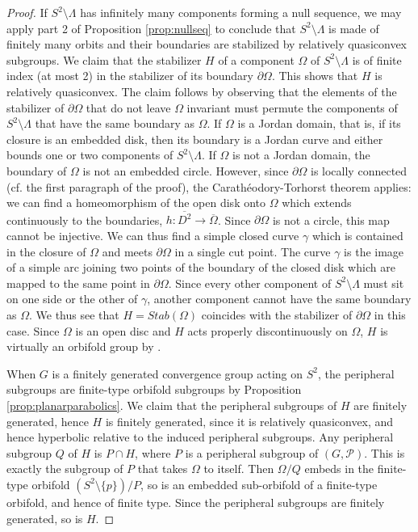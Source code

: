 \documentclass[11pt]{article}
\theoremstyle{definition}
\begin{document}
\begin{proof}
If $ S^2 \setminus\Lambda$ has infinitely many components forming a null sequence, we may apply part 2 of Proposition \ref{prop:nullseq} to conclude that $S^2\setminus\Lambda$ is made of finitely many orbits and their boundaries are stabilized by relatively quasiconvex subgroups. We claim that the stabilizer $H$ of a component $\Omega$ of $S^2\setminus\Lambda$ is of finite index (at most 2) in the stabilizer of its boundary $\partial\Omega$. This shows that $H$ is relatively quasiconvex. The claim follows by observing that the elements of the stabilizer of $\partial\Omega$ that do not leave $\Omega$ invariant must permute the components of $S^2\setminus\Lambda$ that have the same boundary as $\Omega$. If $\Omega$ is a Jordan domain, that is, if its closure is an embedded disk, then its boundary is a Jordan curve and either bounds one or two 
components of $S^2\setminus\Lambda$.  If $\Omega$ is not a Jordan domain, the boundary of $\Omega$ is not an embedded circle. However, since $\partial\Omega$ is locally connected  (cf. the first paragraph of the proof), the Carath\'eodory-Torhorst theorem applies: we can find a homeomorphism of the open disk onto $\Omega$ which extends continuously to the boundaries, {$h: \overline{D^2} \rightarrow \overline{\Omega}$}. Since $\partial\Omega$ is not a circle, this map cannot be injective. We can thus find a simple closed curve $\gamma$ which is contained in the closure of $\Omega$ and meets $\partial\Omega$ in a single cut point. The curve $\gamma$ is the image of a simple arc joining two points of the boundary of the closed disk which are mapped to the same point in $\partial\Omega$. Since every other component of $S^2\setminus\Lambda$ must sit on one side or the other of $\gamma$, another component cannot have the same boundary as $\Omega$. We thus see that $H = Stab(\Omega)$ coincides with the stabilizer of $\partial\Omega$ in this case.  Since $\Omega$ is an open disc and $H$ acts properly discontinuously on $\Omega$, $H$ is  virtually an orbifold group by \cite[Cor. 3.2]{hruska:walsh}.

When $G$ is a finitely generated convergence group acting on $S^2$, the peripheral subgroups are finite-type orbifold subgroups by Proposition \ref{prop:planarparabolics}. We claim that the peripheral subgroups of $H$ are finitely generated, hence $H$ is finitely generated, since it is relatively quasiconvex, and hence hyperbolic relative to the induced peripheral subgroups.   Any peripheral subgroup $Q$ of $H$ is $P\cap H$, where $P$ is a peripheral subgroup of $(G, \mathcal{P})$.  This is exactly the subgroup of $P$ that takes $\Omega$ to itself.  Then $\Omega/Q$ embeds in the finite-type orbifold $(S^2 \setminus \{p\})/P$, so is an embedded sub-orbifold of a finite-type orbifold, and hence of finite type.  Since the peripheral subgroups are finitely generated, so is $H$. 
\end{proof}
 
\end{document}
